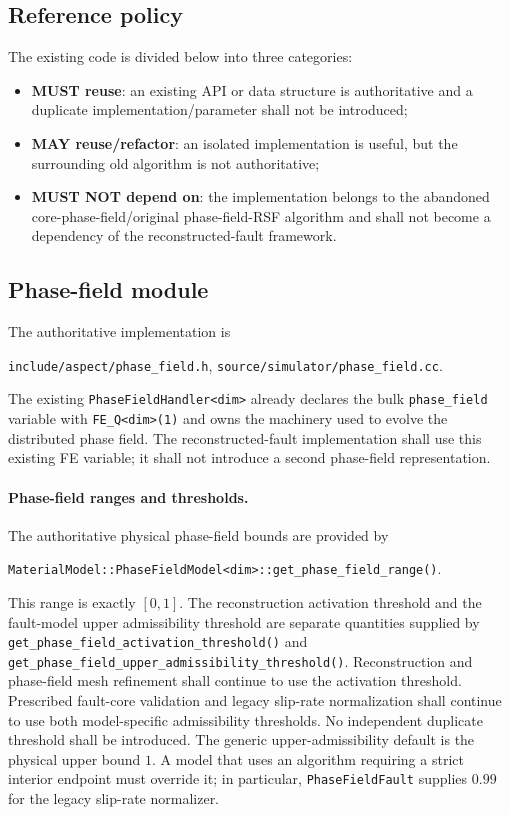 \documentclass[11pt]{article}
\begin{document}
\subsection{Reference policy}
The existing code is divided below into three categories:
\begin{itemize}
  \item \textbf{MUST reuse}: an existing API or data structure is authoritative and a duplicate implementation/parameter shall not be introduced;
  \item \textbf{MAY reuse/refactor}: an isolated implementation is useful, but the surrounding old algorithm is not authoritative;
  \item \textbf{MUST NOT depend on}: the implementation belongs to the abandoned core-phase-field/original phase-field-RSF algorithm and shall not become a dependency of the reconstructed-fault framework.
\end{itemize}

\subsection{Phase-field module}
The authoritative implementation is
\begin{center}
\texttt{include/aspect/phase\_field.h},\qquad
\texttt{source/simulator/phase\_field.cc}.
\end{center}
The existing \texttt{PhaseFieldHandler<dim>} already declares the bulk \texttt{phase\_field} variable with \texttt{FE\_Q<dim>(1)} and owns the machinery used to evolve the distributed phase field.  The reconstructed-fault implementation shall use this existing FE variable; it shall not introduce a second phase-field representation.

\paragraph{Phase-field ranges and thresholds.}
The authoritative physical phase-field bounds are provided by
\begin{center}
\texttt{MaterialModel::PhaseFieldModel<dim>::get\_phase\_field\_range()}.
\end{center}
This range is exactly $[0,1]$. The reconstruction
activation threshold and the fault-model upper admissibility threshold are
separate quantities supplied by
\texttt{get\_phase\_field\_activation\_threshold()} and
\texttt{get\_phase\_field\_upper\_admissibility\_threshold()}.
Reconstruction and phase-field mesh refinement shall continue to use the
activation threshold. Prescribed fault-core validation and legacy slip-rate
normalization shall continue to use both model-specific admissibility
thresholds. No independent duplicate threshold shall be introduced.
The generic upper-admissibility default is the physical upper bound $1$. A
model that uses an algorithm requiring a strict interior endpoint must
override it; in particular, \texttt{PhaseFieldFault} supplies $0.99$ for the
legacy slip-rate normalizer.
\end{document}
